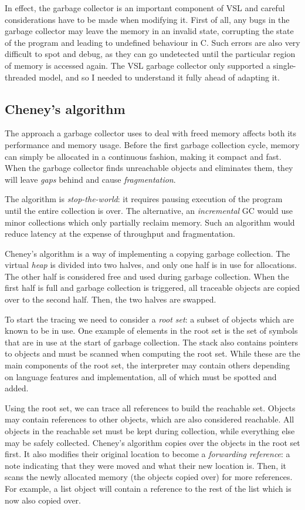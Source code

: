 In effect, the garbage collector is an important component of VSL and careful considerations
have to be made when modifying it. First of all, any bugs in the garbage collector may leave the memory in
an invalid state, corrupting the state of the program and leading to undefined behaviour in C. Such errors
are also very difficult to spot and debug, as they can go undetected until the particular region of memory
is accessed again. The VSL garbage collector only supported a single-threaded model, and so I needed to
understand it fully ahead of adapting it.

\subsection{Cheney's algorithm}
The approach a garbage collector uses to deal with freed memory affects both its performance and memory usage.
Before the first garbage collection cycle, memory can simply be allocated in a continuous fashion, making it
compact and fast. When the garbage collector finds unreachable objects and eliminates them, they will leave
\emph{gaps} behind and cause \emph{fragmentation}.

The algorithm is \emph{stop-the-world}:
it requires pausing execution of the program until the entire collection is over.
The alternative, an \emph{incremental} GC would use minor collections which only partially reclaim memory.
Such an algorithm would reduce latency at the expense of throughput and fragmentation.

Cheney's algorithm \cite{cheney} is a way of implementing a copying garbage collection.
The virtual \emph{heap} is divided into
two halves, and only one half is in use for allocations. The other half is considered free and used during garbage
collection. When the first half is full and garbage collection is triggered, all traceable objects are copied over
to the second half. Then, the two halves are swapped.

To start the tracing we need to consider a \emph{root set}: a subset of objects which are known to be in use.
One example of elements in the root set is the set of symbols that are in use at the start of garbage collection.
The stack also contains pointers to objects and must be scanned when computing the root set.
While these are the main components of the root set, the interpreter may contain others depending on language features
and implementation, all of which must be spotted and added.

Using the root set, we can trace all references to build the reachable set. Objects may contain references
to other objects, which are also considered reachable.
All objects in the reachable set must be kept during collection, while everything else may be safely collected.
Cheney's algorithm copies over the objects in the root set first. It also modifies their original location to become
a \emph{forwarding reference}: a note indicating that they were moved and what their new location is. Then, it scans
the newly allocated memory (the objects copied over) for more references.
For example, a list object will contain a reference to the rest of the list which is now also copied over.

